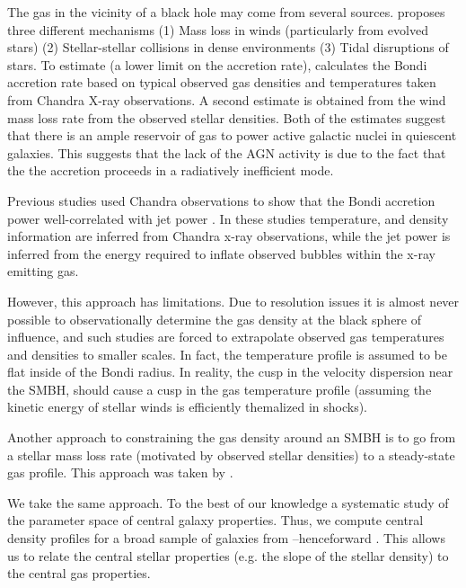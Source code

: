 \documentclass[usenatbib,fleqn]{mn2e}
\begin{document}
The gas in the vicinity of a black hole may come from several sources. \citealt{Ho:2009a} proposes three different mechanisms (1) Mass loss in winds (particularly from evolved stars) (2) Stellar-stellar collisions in dense environments (3) Tidal disruptions of stars. To estimate (a lower limit on the accretion rate), \citealt{Ho:2009a} calculates the Bondi accretion rate based on typical observed gas densities and temperatures taken from Chandra X-ray observations. A second estimate is obtained from the wind mass loss rate from the observed stellar densities. Both of the estimates suggest that there is an ample reservoir of gas to power active galactic nuclei in quiescent galaxies. This suggests that the lack of the AGN activity is due to the fact that the the accretion proceeds in a radiatively inefficient mode. 

Previous studies used Chandra observations to show that the Bondi accretion power well-correlated with jet power \citep{AllenDunn+:2006a,FujitaKawakatu+:2014a}. In these studies temperature, and density information are inferred from Chandra x-ray observations, while the jet power is inferred from the energy required to inflate observed bubbles within the x-ray emitting gas. 

However, this approach has limitations. Due to resolution issues it is almost never possible to observationally determine the gas density at the black sphere of influence, and such studies are forced to extrapolate observed gas temperatures and densities to smaller scales.  In fact, the temperature profile is assumed to be flat inside of the Bondi radius.  In reality, the cusp in the velocity dispersion near the SMBH, should cause a cusp in the gas temperature profile (assuming the kinetic energy of stellar winds is efficiently themalized in shocks). 

Another approach to constraining the gas density around an SMBH is to go from a stellar mass loss rate (motivated by observed stellar densities) to a steady-state gas profile. This approach was taken by \citealt{Quataert:2004a,De-ColleGuillochon+:2012a,ShcherbakovWong+:2014a}.  

We take the same approach. To the best of our knowledge a systematic study of the parameter space of central galaxy properties. Thus, we compute central density profiles for a broad sample of galaxies from \citealt{WangMerritt:2004a}--henceforward .  This allows us to relate the central stellar properties (e.g. the slope of the stellar density) to the central gas properties.  
\end{document}
